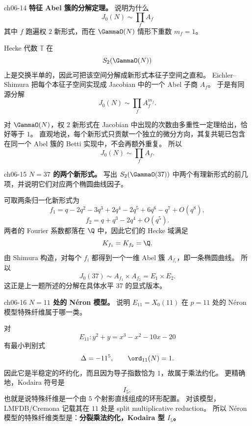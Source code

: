 \begin{problem}{ch06-14}
\textbf{特征 Abel 簇的分解定理。}
说明为什么
\[
J_0(N)\sim \prod_f A_f
\]
其中 $f$ 跑遍权 $2$ 新形式，而在 $\GammaO(N)$ 情形下重数 $m_f=1$。
\end{problem}
\begin{solution}
Hecke 代数 $\mathbb T$ 在
\[
S_2(\GammaO(N))
\]
上是交换半单的，因此可把该空间分解成新形式本征子空间之直和。
Eichler--Shimura 把每个本征子空间实现成 Jacobian 中的一个 Abel 子商 $A_f$。
于是有同源分解
\[
J_0(N)\sim \prod_f A_f^{m_f}.
\]

对 $\GammaO(N)$，权 $2$ 新形式在 Jacobian 中出现的次数由多重性一定理给出，恰好等于 $1$。
直观地说，每个新形式只贡献一个独立的微分方向，其复共轭已包含在同一个 Abel 簇的 Betti 实现中，不会再额外重复。
所以
\[
J_0(N)\sim \prod_f A_f.
\]
\end{solution}

\begin{problem}{ch06-15}
\textbf{$N=37$ 的两个新形式。}
写出 $S_2(\GammaO(37))$ 中两个有理新形式的前几项，并说明它们对应两个椭圆曲线因子。
\end{problem}
\begin{solution}
可取两条归一化新形式为
\[
f_1=q-2q^2-3q^3+2q^4-2q^5+6q^6-q^7+O(q^8),
\]
\[
f_2=q+q^3-2q^4+O(q^5).
\]
两者的 Fourier 系数都落在 $\Q$ 中，因此它们的 Hecke 域满足
\[
K_{f_1}=K_{f_2}=\Q.
\]
由 Shimura 构造，对每个 $f_i$ 都得到一个一维 Abel 簇 $A_{f_i}$，即一条椭圆曲线。
所以
\[
J_0(37)\sim A_{f_1}\times A_{f_2}=E_1\times E_2.
\]
这正是上一题所述的分解在具体水平 $37$ 的显式版本。
\end{solution}

\begin{problem}{ch06-16}
\textbf{$N=11$ 处的 N\'eron 模型。}
说明 $E_{11}=X_0(11)$ 在 $p=11$ 处的 N\'eron 模型特殊纤维属于哪一类。
\end{problem}
\begin{solution}
对
\[
E_{11}: y^2+y=x^3-x^2-10x-20
\]
有最小判别式
\[
\Delta=-11^5,
\qquad \ord_{11}(N)=1.
\]
因此它是半稳定的坏约化，而且因为导子指数恰为 $1$，故属于乘法约化。
更精确地，Kodaira 符号是
\[
I_5,
\]
也就是说特殊纤维是一个由 $5$ 个射影直线组成的环形配置。
对该模型，LMFDB/Cremona 记载其在 $11$ 处是 split multiplicative reduction。
所以 N\'eron 模型的特殊纤维类型是：\textbf{分裂乘法约化，Kodaira 型 $I_5$。}
\end{solution}

